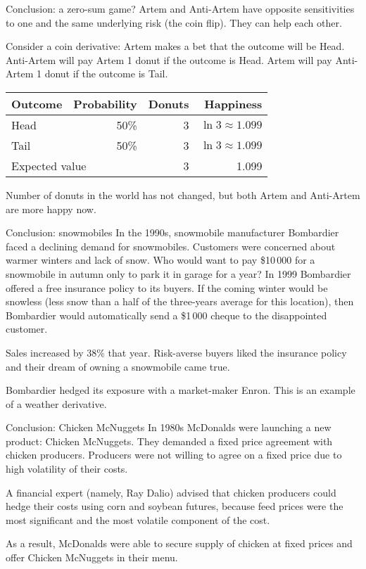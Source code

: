 \documentclass{beamer}
\begin{document}
\begin{frame}{Conclusion: a zero-sum game?}
\justify
Artem and Anti-Artem have opposite sensitivities to one and the same underlying risk (the coin flip). They can help each other.

\justify
Consider a coin derivative: Artem makes a bet that the outcome will be Head. Anti-Artem will pay Artem 1 donut if the outcome is Head. Artem will pay Anti-Artem 1 donut if the outcome is Tail.

\justify
\centering
\begin{tabular}{l|r|r|r}
Outcome & Probability & Donuts & Happiness \\ \hline
Head & 50\% & 3 & $\ln 3 \approx 1.099$ \\
Tail & 50\% & 3 & $\ln 3 \approx 1.099$ \\ \hline
\multicolumn{2}{l|}{Expected value} & 3 & 1.099
\end{tabular}

\justify
Number of donuts in the world has not changed, but both Artem and Anti-Artem are more happy now.
\end{frame}



\begin{frame}{Conclusion: snowmobiles}
\justify
 In  the 1990s, snowmobile manufacturer Bombardier faced a declining demand for snowmobiles. Customers were concerned about warmer winters and lack of snow.  Who would want to pay \$10\,000 for a snowmobile in autumn only to park it in garage for a year?
\justify
In 1999 Bombardier offered a free insurance policy to its buyers. If the coming winter would be snowless (less snow than a half of the three-years average for this location), then Bombardier would automatically send a \$1\,000 cheque to the disappointed customer.

\justify
Sales increased by 38\% that year. Risk-averse buyers liked the insurance policy and their dream of owning a snowmobile came true.

\justify
Bombardier hedged its exposure with a market-maker Enron. This is an example of a weather derivative.
\end{frame}




\begin{frame}{Conclusion: Chicken McNuggets}
\justify
In 1980s McDonalds were launching a new product: Chicken McNuggets. They demanded a fixed price agreement  with chicken producers. Producers were not willing to agree on a fixed price due to high volatility of their costs.

\justify
A financial expert (namely, Ray Dalio) advised that chicken producers could hedge their costs using corn and soybean futures, because feed prices were the most significant and the most volatile component of the cost.

\justify
As a result, McDonalds were able to secure supply of chicken at fixed prices and offer Chicken McNuggets in their menu. 
\end{frame}
\end{document}
